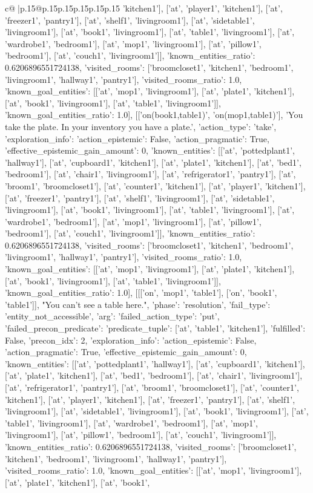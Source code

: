 \documentclass{article}
\begin{document}
{\begin{supertabular}{c@{$\;$}|p{.15\linewidth}@{}p{.15\linewidth}p{.15\linewidth}p{.15\linewidth}p{.15\linewidth}p{.15\linewidth}}
{{{'kitchen1'], ['at', 'player1', 'kitchen1'], ['at', 'freezer1', 'pantry1'], ['at', 'shelf1', 'livingroom1'], ['at', 'sidetable1', 'livingroom1'], ['at', 'book1', 'livingroom1'], ['at', 'table1', 'livingroom1'], ['at', 'wardrobe1', 'bedroom1'], ['at', 'mop1', 'livingroom1'], ['at', 'pillow1', 'bedroom1'], ['at', 'couch1', 'livingroom1']], 'known_entities_ratio': 0.6206896551724138, 'visited_rooms': ['broomcloset1', 'kitchen1', 'bedroom1', 'livingroom1', 'hallway1', 'pantry1'], 'visited_rooms_ratio': 1.0, 'known_goal_entities': [['at', 'mop1', 'livingroom1'], ['at', 'plate1', 'kitchen1'], ['at', 'book1', 'livingroom1'], ['at', 'table1', 'livingroom1']], 'known_goal_entities_ratio': 1.0}}], [['on(book1,table1)', 'on(mop1,table1)'], 'You take the plate. In your inventory you have a plate.', {'action_type': 'take', 'exploration_info': {'action_epistemic': False, 'action_pragmatic': True, 'effective_epistemic_gain_amount': 0, 'known_entities': [['at', 'pottedplant1', 'hallway1'], ['at', 'cupboard1', 'kitchen1'], ['at', 'plate1', 'kitchen1'], ['at', 'bed1', 'bedroom1'], ['at', 'chair1', 'livingroom1'], ['at', 'refrigerator1', 'pantry1'], ['at', 'broom1', 'broomcloset1'], ['at', 'counter1', 'kitchen1'], ['at', 'player1', 'kitchen1'], ['at', 'freezer1', 'pantry1'], ['at', 'shelf1', 'livingroom1'], ['at', 'sidetable1', 'livingroom1'], ['at', 'book1', 'livingroom1'], ['at', 'table1', 'livingroom1'], ['at', 'wardrobe1', 'bedroom1'], ['at', 'mop1', 'livingroom1'], ['at', 'pillow1', 'bedroom1'], ['at', 'couch1', 'livingroom1']], 'known_entities_ratio': 0.6206896551724138, 'visited_rooms': ['broomcloset1', 'kitchen1', 'bedroom1', 'livingroom1', 'hallway1', 'pantry1'], 'visited_rooms_ratio': 1.0, 'known_goal_entities': [['at', 'mop1', 'livingroom1'], ['at', 'plate1', 'kitchen1'], ['at', 'book1', 'livingroom1'], ['at', 'table1', 'livingroom1']], 'known_goal_entities_ratio': 1.0}}], [[['on', 'mop1', 'table1'], ['on', 'book1', 'table1']], "You can't see a table here.", {'phase': 'resolution', 'fail_type': 'entity_not_accessible', 'arg': {'failed_action_type': 'put', 'failed_precon_predicate': {'predicate_tuple': ['at', 'table1', 'kitchen1'], 'fulfilled': False, 'precon_idx': 2}}, 'exploration_info': {'action_epistemic': False, 'action_pragmatic': True, 'effective_epistemic_gain_amount': 0, 'known_entities': [['at', 'pottedplant1', 'hallway1'], ['at', 'cupboard1', 'kitchen1'], ['at', 'plate1', 'kitchen1'], ['at', 'bed1', 'bedroom1'], ['at', 'chair1', 'livingroom1'], ['at', 'refrigerator1', 'pantry1'], ['at', 'broom1', 'broomcloset1'], ['at', 'counter1', 'kitchen1'], ['at', 'player1', 'kitchen1'], ['at', 'freezer1', 'pantry1'], ['at', 'shelf1', 'livingroom1'], ['at', 'sidetable1', 'livingroom1'], ['at', 'book1', 'livingroom1'], ['at', 'table1', 'livingroom1'], ['at', 'wardrobe1', 'bedroom1'], ['at', 'mop1', 'livingroom1'], ['at', 'pillow1', 'bedroom1'], ['at', 'couch1', 'livingroom1']], 'known_entities_ratio': 0.6206896551724138, 'visited_rooms': ['broomcloset1', 'kitchen1', 'bedroom1', 'livingroom1', 'hallway1', 'pantry1'], 'visited_rooms_ratio': 1.0, 'known_goal_entities': [['at', 'mop1', 'livingroom1'], ['at', 'plate1', 'kitchen1'], ['at', 'book1', }}}
\end{supertabular}}
\end{document}
